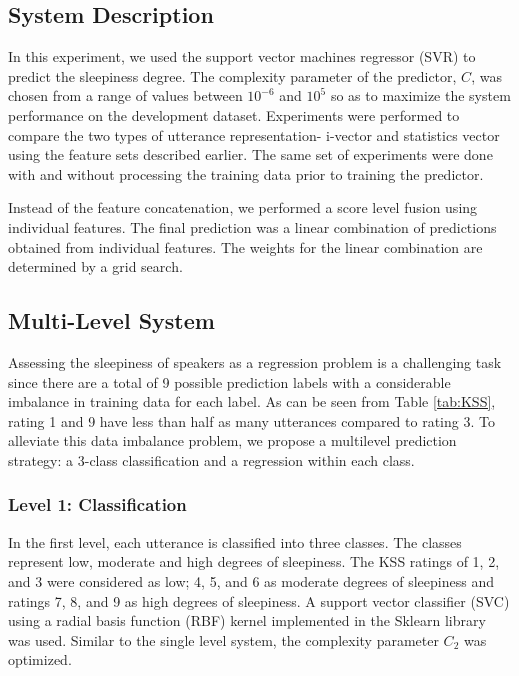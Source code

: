 \subsection{System Description}

In this experiment, we used the support vector machines regressor (SVR) to predict the sleepiness degree. The complexity parameter of the predictor, $C$, was chosen from a range of values between $10^{-6}$ and $10^{5}$ so as to maximize the system performance on the development dataset. Experiments were performed to compare the two types of utterance representation- i-vector and statistics vector using the feature sets described earlier. The same set of experiments were done with and without processing the training data prior to training the predictor. 

Instead of the feature concatenation, we performed a score level fusion using individual features. The final prediction was a linear combination of predictions obtained from individual features. The weights for the linear combination are determined by a grid search. 


 


\iffalse
\subsection{Multi-Level System}

Assessing the sleepiness of speakers as a regression problem is a challenging task since there are a total of 9 possible prediction labels with a considerable imbalance in training data for each label. As can be seen from Table \ref{tab:KSS}, rating 1 and 9 have less than half as many utterances compared to rating 3. To alleviate this data imbalance problem, we propose a multilevel prediction strategy: a 3-class classification and a regression within each class. 

\subsubsection{Level 1: Classification}

In the first level, each utterance is  classified into three classes. The classes represent low, moderate and high degrees of sleepiness. The KSS ratings of 1, 2, and 3 were considered as low;  4, 5, and 6 as moderate degrees of sleepiness and ratings 7, 8, and 9 as high degrees of sleepiness. 
A support vector classifier (SVC) using a radial basis function (RBF) kernel implemented in the Sklearn library was used. Similar to the single level system, the complexity parameter $C_2$ was optimized.

